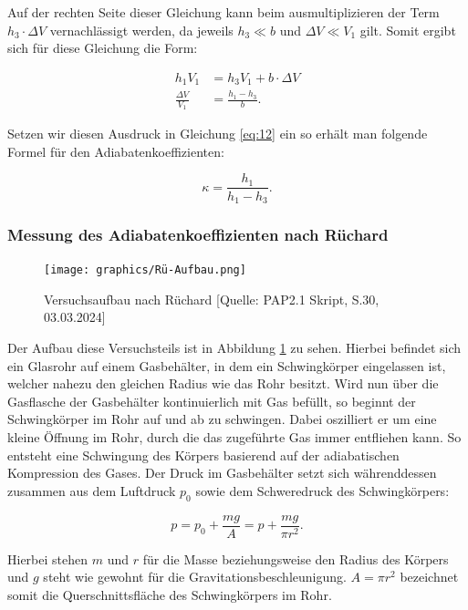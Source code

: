 \documentclass{article}
\begin{document}
Auf der rechten Seite dieser Gleichung kann beim ausmultiplizieren der Term $h_3 \cdot \Delta V$ vernachlässigt werden, da jeweils $h_3 \ll b$ und $\Delta V \ll V_1$ gilt. Somit ergibt sich für diese Gleichung die Form:

\begin{equation}
    \begin{split}
        h_1 V_1 &= h_3 V_1 + b \cdot \Delta V \\
        \frac{\Delta V}{V_1} &= \frac{h_1 - h_3}{b}.
    \end{split}
\end{equation}

Setzen wir diesen Ausdruck in Gleichung \ref{eq:12} ein so erhält man folgende Formel für den Adiabatenkoeffizienten:

\begin{equation}
    \kappa = \frac{h_1}{h_1 - h_3}.
    \label{eq:CD_kappa}
\end{equation}

\subsubsection{Messung des Adiabatenkoeffizienten nach Rüchard}

\begin{figure}
    \centering
    \texttt{[image: graphics/Rü-Aufbau.png]}
    \caption{Versuchsaufbau nach Rüchard [Quelle: PAP2.1 Skript, S.30, 03.03.2024]}
    \label{fig:Rü-Aufbau}
\end{figure}

Der Aufbau diese Versuchsteils ist in Abbildung \ref{fig:Rü-Aufbau} zu sehen. Hierbei befindet sich ein Glasrohr auf einem Gasbehälter, in dem ein Schwingkörper eingelassen ist, welcher nahezu den gleichen Radius wie das Rohr besitzt. Wird nun über die Gasflasche der Gasbehälter kontinuierlich mit Gas befüllt, so beginnt der Schwingkörper im Rohr auf und ab zu schwingen. Dabei oszilliert er um eine kleine Öffnung im Rohr, durch die das zugeführte Gas immer entfliehen kann. So entsteht eine Schwingung des Körpers basierend auf der adiabatischen Kompression des Gases. Der Druck im Gasbehälter setzt sich währenddessen zusammen aus dem Luftdruck $p_0$ sowie dem Schweredruck des Schwingkörpers:

\begin{equation}
    p = p_0 + \frac{mg}{A} = p + \frac{mg}{\pi r^2}.
    \label{eq:Druck}
\end{equation}

Hierbei stehen $m$ und $r$ für die Masse beziehungsweise den Radius des Körpers und $g$ steht wie gewohnt für die Gravitationsbeschleunigung. $A = \pi r^2$ bezeichnet somit die Querschnittsfläche des Schwingkörpers im Rohr.
\end{document}
